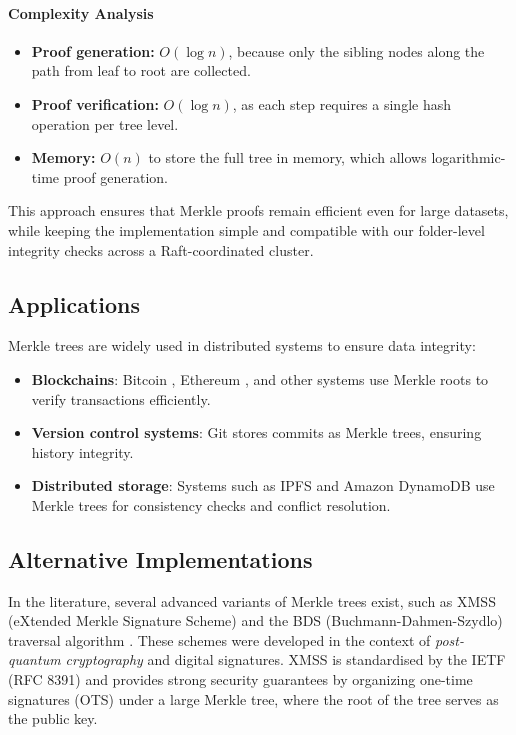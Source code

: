\paragraph{Complexity Analysis}
\begin{itemize}
    \item \textbf{Proof generation:} $O(\log n)$, because only the sibling nodes along the path from leaf to root are collected.  
    \item \textbf{Proof verification:} $O(\log n)$, as each step requires a single hash operation per tree level.  
    \item \textbf{Memory:} $O(n)$ to store the full tree in memory, which allows logarithmic-time proof generation.
\end{itemize}

This approach ensures that Merkle proofs remain efficient even for large datasets, while keeping the implementation simple and compatible with our folder-level integrity checks across a Raft-coordinated cluster.


\subsection{Applications}

Merkle trees are widely used in distributed systems to ensure data integrity:
\begin{itemize}
    \item \textbf{Blockchains}: Bitcoin \cite{bitcoinwiki-merkle}, Ethereum \cite{ethereum-patricia}, and other systems use Merkle roots to verify transactions efficiently.
    \item \textbf{Version control systems}: Git stores commits as Merkle trees, ensuring history integrity.
    \item \textbf{Distributed storage}: Systems such as IPFS \cite{ipfs-merkle-dag} and Amazon DynamoDB \cite{decandia2007dynamo} use Merkle trees for consistency checks and conflict resolution.
\end{itemize}

\subsection{Alternative Implementations}

In the literature, several advanced variants of Merkle trees exist, such as XMSS (eXtended Merkle Signature Scheme) \cite{buchmann2011xmss} and the BDS (Buchmann-Dahmen-Szydlo) traversal algorithm \cite{buchmann2008merkle}. These schemes were developed in the context of \emph{post-quantum cryptography} and digital signatures. XMSS is standardised by the IETF (RFC 8391) and provides strong security guarantees by organizing one-time signatures (OTS) under a large Merkle tree, where the root of the tree serves as the public key.  

